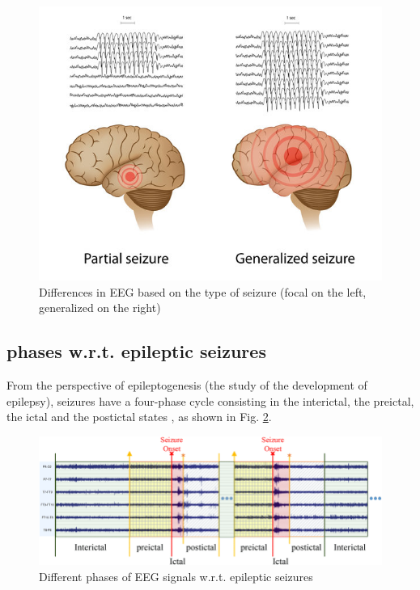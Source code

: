 \begin{figure}[t]
    \centering
    \includegraphics[width=1.0\textwidth]{images/Th-background/eeg-seizure-partial-generalized.jpg}
    \caption{Differences in EEG based on the type of seizure (focal on the left, generalized on the right)          \cite{bates_epileptic_2018}}
    \label{fig:eeg-seizure-partial-generalized}
\end{figure}

\subsection{ phases w.r.t. epileptic seizures}
From the perspective of epileptogenesis \cite{aminoff_encyclopedia_2014} (the study of the development of epilepsy), seizures have a four-phase cycle consisting in the interictal, the preictal, the ictal and the postictal states \cite{cui_learning_2018, epilepsy_foundation_seizure_nodate, heidi_moawad_your_2020}, as shown in Fig. \ref{fig:seizure-phases}.

\begin{figure}[ht]
    \centering
    \includegraphics[width=1.0\textwidth]{images/Th-background/seizure-phases.png}
    \caption{Different phases of EEG signals w.r.t. epileptic seizures \cite{cui_learning_2018}}
    \label{fig:seizure-phases}
\end{figure}

